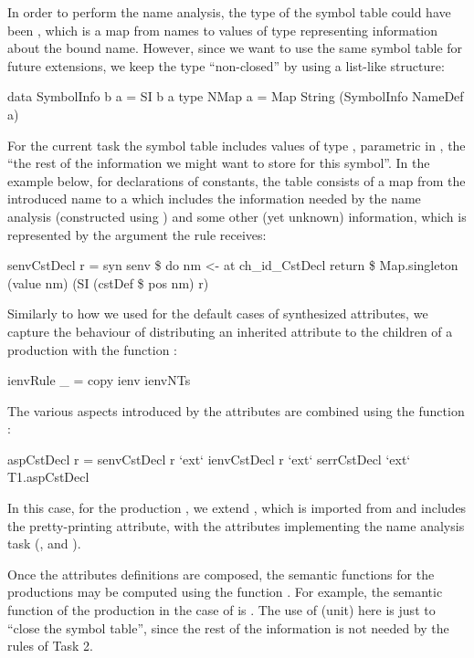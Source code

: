 In order to perform the name analysis, the type of the symbol table could have been 
, which is a map from names to values of type  
representing information about the bound name. However, since we want to use the same symbol table
for future extensions, we keep the type ``non-closed'' by using a list-like structure:
\begin{haskell}
data SymbolInfo b a = SI b a
type NMap a = Map String (SymbolInfo NameDef a)
\end{haskell}
For the current  task the symbol table includes values of type ,
parametric in , the ``the rest of the information we might want to store for this symbol''.
In the example below, for declarations of constants, the table consists of a map from the introduced name 
to a  which includes the information needed by the name analysis (constructed using )
and some other (yet unknown) information, which is represented by the argument the rule receives:
\begin{haskell}
senvCstDecl r = syn senv \$ do  
                  nm <- at ch_id_CstDecl
                  return \$ Map.singleton (value nm) 
                                         (SI (cstDef \$ pos nm) r)
\end{haskell}
Similarly to how we used  for the default cases of synthesized attributes,
we capture the behaviour of distributing an inherited attribute to the children of a production
with the function :
\begin{haskell}
ienvRule _ = copy ienv ienvNTs 
\end{haskell}

The various aspects introduced by the attributes are combined using the function :
\begin{haskell}
aspCstDecl r = senvCstDecl r `ext` ienvCstDecl r `ext` 
               serrCstDecl   `ext` T1.aspCstDecl
\end{haskell}
In this case, for the production , we extend , 
which is imported from  and includes the pretty-printing attribute,
with the attributes implementing the name analysis task (,  and ).

Once the attributes definitions are composed, the semantic functions for the productions may be computed using the function .
For example, the semantic function of the production  in the case of  
is . The use of \texthaskell{()} (unit) here is just to ``close the symbol table'',
since the rest of the information is not needed by the rules of Task 2.


